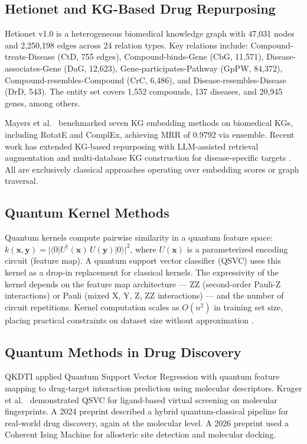 \documentclass[twocolumn,10pt]{article}
\begin{document}
\subsection{Hetionet and KG-Based Drug Repurposing}

Hetionet v1.0 \cite{himmelstein2017} is a heterogeneous biomedical knowledge graph with 47,031 nodes and 2,250,198 edges across 24 relation types. Key relations include: Compound-treats-Disease (CtD, 755 edges), Compound-binds-Gene (CbG, 11,571), Disease-associates-Gene (DaG, 12,623), Gene-participates-Pathway (GpPW, 84,372), Compound-resembles-Compound (CrC, 6,486), and Disease-resembles-Disease (DrD, 543). The entity set covers 1,552 compounds, 137 diseases, and 20,945 genes, among others.

Mayers et al.\ \cite{mayers2023} benchmarked seven KG embedding methods on biomedical KGs, including RotatE and ComplEx, achieving MRR of 0.9792 via ensemble. Recent work has extended KG-based repurposing with LLM-assisted retrieval augmentation \cite{llmrag2025} and multi-database KG construction for disease-specific targets \cite{quantum2026}. All are exclusively classical approaches operating over embedding scores or graph traversal.

\subsection{Quantum Kernel Methods}

Quantum kernels compute pairwise similarity in a quantum feature space: $k(\mathbf{x}, \mathbf{y}) = |\langle 0 | U^\dagger(\mathbf{x})\, U(\mathbf{y}) | 0 \rangle|^2$, where $U(\mathbf{x})$ is a parameterized encoding circuit (feature map). A quantum support vector classifier (QSVC) uses this kernel as a drop-in replacement for classical kernels. The expressivity of the kernel depends on the feature map architecture --- ZZ (second-order Pauli-Z interactions) or Pauli (mixed X, Y, Z, ZZ interactions) --- and the number of circuit repetitions. Kernel computation scales as $O(n^2)$ in training set size, placing practical constraints on dataset size without approximation \cite{schuld2021}.

\subsection{Quantum Methods in Drug Discovery}

QKDTI \cite{qkdti2025} applied Quantum Support Vector Regression with quantum feature mapping to drug-target interaction prediction using molecular descriptors. Kruger et al.\ \cite{kruger2023} demonstrated QSVC for ligand-based virtual screening on molecular fingerprints. A 2024 preprint \cite{hybrid2024} described a hybrid quantum-classical pipeline for real-world drug discovery, again at the molecular level. A 2026 preprint \cite{quantum2026} used a Coherent Ising Machine for allosteric site detection and molecular docking.
\end{document}
